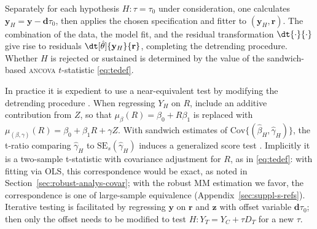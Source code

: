 Separately for each hypothesis $H: \tau=\tau_0$ under
consideration, one calculates
$\mathbf{y}_{H} = \mathbf{y} - \mathbf{d}\tau_{0}$, then
applies the chosen specification and fitter to
$(\mathbf{y}_{H}, \mathbf{r})$.
The combination of the data, the
model fit, and the residual transformation $\dt{\cdot}{\cdot}$ give rise to residuals
$\dt[\hat\theta]{\mathbf{y}_{H}}{\mathbf{r}}$, completing the
detrending procedure. Whether $H$ is rejected or sustained is
determined by the value of the sandwich-based \textsc{ancova} $t$-statistic
\eqref{eq:tedef}.

In practice it is expedient to use a near-equivalent
test by modifying the detrending
procedure%
.
When regressing $Y_{H}$ on $R$, include an additive
contribution from $Z$, so that $\mu_{\beta}(R) =\beta_{0} +
R\beta_{1}$ is replaced with $\mu_{(\beta,\gamma)}(R) =\beta_{0} +
\beta_{1}R + \gamma Z$. With sandwich estimates of
$\text{Cov}\{(\hat{\beta}_{H}, \hat{\gamma}_{H})\}$,
%
%
the t-ratio comparing $\hat{\gamma}_{H}$ to
$\text{SE}_{s}(\hat{\gamma}_{H})$ induces a generalized score test \citep{boos1992genscoretest}. Implicitly it is a two-sample
t-statistic with covariance adjustment for $R$, as in \eqref{eq:tedef}: with fitting via OLS,
this correspondence would be exact, as noted in Section~\ref{sec:robust-analys-covar}; with the robust MM estimation we
favor, the correspondence is one of large-sample equivalence
(Appendix~\ref{sec:suppl-s-refs}).
Iterative testing is facilitated by regressing $\mathbf{y}$ on $\mathbf{r}$ and $\mathbf{z}$
with offset variable $\mathbf{d}\tau_{0}$; then only the offset needs to
be modified to test $H: Y_{T} = Y_{C} +  \tau D_{T}$ for a new $\tau$.

